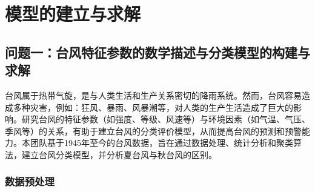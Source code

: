 \documentclass[withoutpreface,bwprint]{cumcmthesis}
\begin{document}
\begin{table}[h]
\centering
\renewcommand{\arraystretch}{0.6} %
\small %
\end{table}




\newpage
\section{模型的建立与求解}

\subsection{问题一：台风特征参数的数学描述与分类模型的构建与求解}

台风属于热带气旋，是与人类生活和生产关系密切的降雨系统。然而，台风容易造成多种灾害，例如：狂风、暴雨、风暴潮等，对人类的生产生活造成了巨大的影响。研究台风的特征参数（如强度、等级、风速等）与环境因素（如气温、气压、季风等）的关系，有助于建立台风的分类评价模型，从而提高台风的预测和预警能力。本团队基于1945年至今的台风数据，旨在通过数据处理、统计分析和聚类算法，建立台风分类模型，并分析夏台风与秋台风的区别。

\subsubsection{数据预处理}
\end{document}
